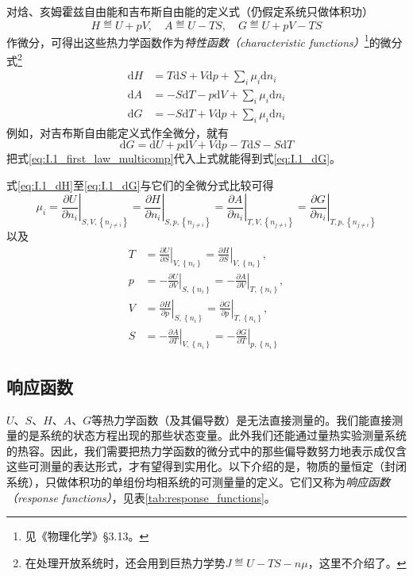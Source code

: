 \documentclass[main.tex]{subfiles}
\begin{document}
对焓、亥姆霍兹自由能和吉布斯自由能的定义式（仍假定系统只做体积功）
\[H\eqdef U+pV,\quad A\eqdef U-TS,\quad G\eqdef U+pV-TS\]
作微分，可得出这些热力学函数作为\emph{特性函数（characteristic functions）}\footnote{见《物理化学》\S 3.13。}的微分式\footnote{在处理开放系统时，还会用到巨热力学势$J\eqdef U-TS-n\mu$，这里不介绍了。}
\begin{align}
  \mathrm{d}H & = T\mathrm{d}S+V\mathrm{d}p+\sum_i\mu_i\mathrm{d}n_i\label{eq:I.1_dH} \\
  \mathrm{d}A & =-S\mathrm{d}T-p\mathrm{d}V+\sum_i\mu_i\mathrm{d}n_i\label{eq:I.1_dA} \\
  \mathrm{d}G & =-S\mathrm{d}T+V\mathrm{d}p+\sum_i\mu_i\mathrm{d}n_i\label{eq:I.1_dG}
\end{align}
例如，对吉布斯自由能定义式作全微分，就有
\[\mathrm{d}G=\mathrm{d}U+p\mathrm{d}V+V\mathrm{d}p-T\mathrm{d}S-S\mathrm{d}T\]
把式\eqref{eq:I.1_first_law_multicomp}代入上式就能得到式\eqref{eq:I.1_dG}。

式\eqref{eq:I.1_dH}至\eqref{eq:I.1_dG}与它们的全微分式比较可得
\begin{equation}
  \mu_i=\left.\frac{\partial U}{\partial n_i}\right|_{S,V,\left\{n_{j\neq i}\right\}}
  =\left.\frac{\partial H}{\partial n_i}\right|_{S,p,\left\{n_{j\neq i}\right\}}
  =\left.\frac{\partial A}{\partial n_i}\right|_{T,V,\left\{n_{j\neq i}\right\}}
  =\left.\frac{\partial G}{\partial n_i}\right|_{T,p,\left\{n_{j\neq i}\right\}}\label{eq:I.1_first_order_partial_mu}
\end{equation}
以及
\begin{align}
  T & =\left.\frac{\partial U}{\partial S}\right|_{V,\left\{n_i\right\}}=\left.\frac{\partial H}{\partial S}\right|_{V,\left\{n_i\right\}},\label{eq:I.1_first_order_partial_T}   \\
  p & =-\left.\frac{\partial U}{\partial V}\right|_{S,\left\{n_i\right\}}=-\left.\frac{\partial A}{\partial V}\right|_{T,\left\{n_i\right\}},\label{eq:I.1_first_order_partial_p} \\
  V & =\left.\frac{\partial H}{\partial p}\right|_{S,\left\{n_i\right\}}=\left.\frac{\partial G}{\partial p}\right|_{T,\left\{n_i\right\}},\label{eq:I.1_first_order_partial_V}   \\
  S & =-\left.\frac{\partial A}{\partial T}\right|_{V,\left\{n_i\right\}}=-\left.\frac{\partial G}{\partial T}\right|_{p,\left\{n_i\right\}}\label{eq:I.1_first_order_partial_S}
\end{align}

\subsection{响应函数}
$U$、$S$、$H$、$A$、$G$等热力学函数（及其偏导数）是无法直接测量的。我们能直接测量的是系统的状态方程出现的那些状态变量。此外我们还能通过量热实验测量系统的热容。因此，我们需要把热力学函数的微分式中的那些偏导数努力地表示成仅含这些可测量的表达形式，才有望得到实用化。以下介绍的是，物质的量恒定（封闭系统），只做体积功的单组份均相系统的可测量量的定义。它们又称为\emph{响应函数（response functions）}，见表\ref{tab:response_functions}。
\end{document}
